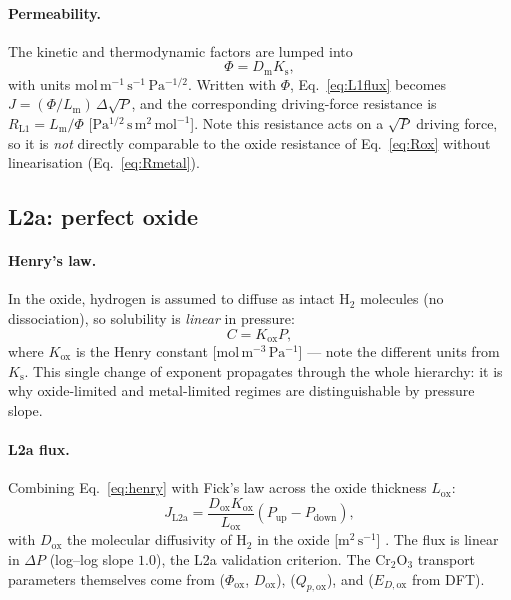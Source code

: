 \documentclass[11pt,a4paper]{article}
\newcommand{\Pup}{P_{\mathrm{up}}}
\newcommand{\Pdown}{P_{\mathrm{down}}}
\newcommand{\Ks}{K_{\mathrm{s}}}
\newcommand{\Kox}{K_{\mathrm{ox}}}
\newcommand{\Dm}{D_{\mathrm{m}}}
\newcommand{\Dox}{D_{\mathrm{ox}}}
\newcommand{\Lm}{L_{\mathrm{m}}}
\newcommand{\Lox}{L_{\mathrm{ox}}}
\begin{document}
\paragraph{Permeability.} The kinetic and thermodynamic factors are lumped into
\begin{equation}
  \Phi = \Dm \Ks,
  \label{eq:permeability}
\end{equation}
with units $\mathrm{mol\,m^{-1}\,s^{-1}\,Pa^{-1/2}}$. Written with $\Phi$,
Eq.~\eqref{eq:L1flux} becomes $J = (\Phi/\Lm)\,\Delta\sqrt{P}$, and the
corresponding driving-force resistance is $R_{\mathrm{L1}} = \Lm/\Phi$
[$\mathrm{Pa^{1/2}\,s\,m^{2}\,mol^{-1}}$]. Note this resistance acts on a
$\sqrt{P}$ driving force, so it is \emph{not} directly comparable to the
oxide resistance of Eq.~\eqref{eq:Rox} without linearisation
(Eq.~\eqref{eq:Rmetal}).

\subsection{L2a: perfect oxide}

\paragraph{Henry's law.} In the oxide, hydrogen is assumed to diffuse as
intact $\mathrm{H_2}$ molecules (no dissociation), so solubility is
\emph{linear} in pressure:
\begin{equation}
  C = \Kox P,
  \label{eq:henry}
\end{equation}
where $\Kox$ is the Henry constant [$\mathrm{mol\,m^{-3}\,Pa^{-1}}$] --- note
the different units from $\Ks$. This single change of exponent propagates
through the whole hierarchy: it is why oxide-limited and metal-limited regimes
are distinguishable by pressure slope.

\paragraph{L2a flux.} Combining Eq.~\eqref{eq:henry} with Fick's law across
the oxide thickness $\Lox$:
\begin{equation}
  J_{\mathrm{L2a}} = \frac{\Dox \Kox}{\Lox}\left(\Pup - \Pdown\right),
  \label{eq:L2aflux}
\end{equation}
with $\Dox$ the molecular diffusivity of $\mathrm{H_2}$ in the oxide
[$\mathrm{m^2\,s^{-1}}$] \citep{strehlow1974,hollenberg1995}. The flux is
linear in $\Delta P$ (log--log slope $1.0$), the L2a validation criterion.
The $\mathrm{Cr_2O_3}$ transport parameters themselves come from
\citet{nemanic2023} ($\Phi_{\mathrm{ox}}$, $\Dox$), \citet{stover1986}
($Q_{p,\mathrm{ox}}$), and \citet{chen2011} ($E_{D,\mathrm{ox}}$ from DFT).
\end{document}
